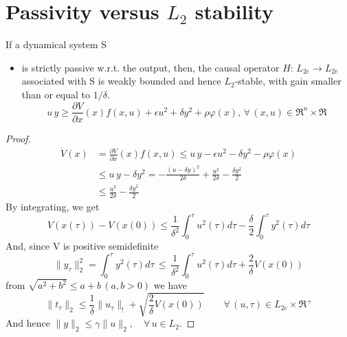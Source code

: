 \section{Passivity versus $L_2$ stability}
\begin{thm}
	If a dynamical system S
	\begin{itemize}
		\item is strictly passive w.r.t. the output, then, the causal operator $H:\, L_{2e} \to L_{2e}$ associated with S is weakly bounded and hence $L_2$-stable, with gain smaller than or equal to $1/\delta$.
		\[
		u \, y \ge \frac{\partial V}{\partial x}(x)f(x,u)+\epsilon u^2+\delta y^2+ \rho \varphi(x),\,\forall \, (x,u)\in \Re^n \times \Re
		\]
	\end{itemize}
\end{thm}
\begin{proof}
	\[\begin{aligned}
		\dot{V}(x)&=\frac{\partial V}{\partial x}(x)f(x,u)\le u \, y -\epsilon u^2-\delta y^2 - \rho \varphi(x)\\
			&\le u \, y-\delta y^2 = -\frac{(u-\delta y)^2}{2\delta}+\frac{u^2}{2\delta}-\frac{\delta  y^2}{2}\\
			&\le \frac{u^2}{2\delta}-\frac{\delta y^2}{2}
	\end{aligned}\]
By integrating, we get 
\[
V(x(\tau))-V(x(0))\le \frac{1}{\delta^2}\int_{0}^{\tau}u^2(\tau)d\tau-\frac{\delta}{2}\int_{0}^{\tau}y^2(\tau)d\tau
\]
And, since V is positive semidefinite
\[
\|y_{\tau}\|_2^2=\int_{0}^{\tau}y^2(\tau)d\tau\,  \le\, \frac{1}{\delta^2}\int_{0}^{\tau}u^2(\tau)d\tau+\frac{2}{\delta}V(x(0))
\]
from $\sqrt{a^2+b^2}\le a+b \, (a,b>0)$ we have
\[
\|t_{\tau}\|_2\le \frac{1}{\delta}\|u_{\tau}\|_!+\sqrt{\frac{2}{\delta}V(x(0))}\qquad \forall \, (u,\tau) \in L_{2e}\times \Re^+
\]
And hence $\|y\|_2\le \gamma\|u\|_2,\quad \forall \, u \in L_2$.
\end{proof}